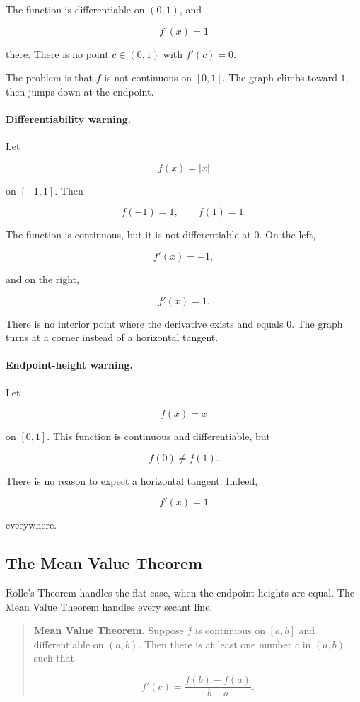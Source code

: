 The function is differentiable on \((0,1)\), and

\[
f'(x)=1
\]

there.  There is no point \(c\in(0,1)\) with \(f'(c)=0\).

The problem is that \(f\) is not continuous on \([0,1]\).  The graph climbs toward
\(1\), then jumps down at the endpoint.

\paragraph{Differentiability warning.}
Let

\[
f(x)=|x|
\]

on \([-1,1]\).  Then

\[
f(-1)=1,
\qquad
f(1)=1.
\]

The function is continuous, but it is not differentiable at \(0\).  On the left,

\[
f'(x)=-1,
\]

and on the right,

\[
f'(x)=1.
\]

There is no interior point where the derivative exists and equals \(0\).  The graph
turns at a corner instead of a horizontal tangent.

\paragraph{Endpoint-height warning.}
Let

\[
f(x)=x
\]

on \([0,1]\).  This function is continuous and differentiable, but

\[
f(0)\neq f(1).
\]

There is no reason to expect a horizontal tangent.  Indeed,

\[
f'(x)=1
\]

everywhere.

\subsection{The Mean Value Theorem}
\label{subsec:mean-value-theorem}

Rolle's Theorem handles the flat case, when the endpoint heights are equal.  The
Mean Value Theorem handles every secant line.

\begin{quote}
\textbf{Mean Value Theorem.}
Suppose \(f\) is continuous on \([a,b]\) and differentiable on \((a,b)\).  Then there is
at least one number \(c\) in \((a,b)\) such that

\[
\boxed{
f'(c)=\frac{f(b)-f(a)}{b-a}.
}
\]
\end{quote}

